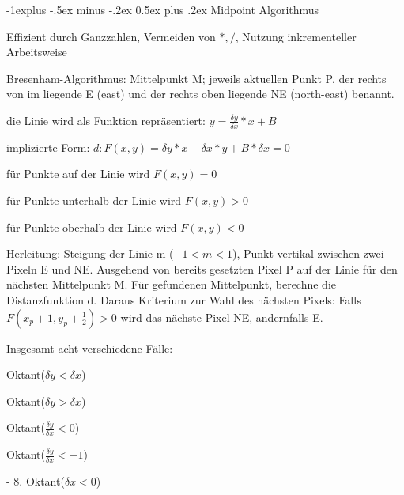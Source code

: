\documentclass[landscape]{article}
\makeatletter
\renewcommand{\subsection}{\@startsection{subsection}{2}{0mm}%
                                {-1explus -.5ex minus -.2ex}%
                                {0.5ex plus .2ex}%
                                {\normalfont\normalsize\bfseries}}
\makeatother
\begin{document}
\begin{multicols}{3}
  \subsection{ Midpoint Algorithmus}
  \begin{itemize*}
    \item Effizient durch Ganzzahlen, Vermeiden von $*,/$, Nutzung inkrementeller Arbeitsweise
    \item Bresenham-Algorithmus: Mittelpunkt M; jeweils aktuellen Punkt P, der rechts von im liegende E (east) und der rechts oben liegende NE (north-east) benannt.
    \item die Linie wird als Funktion repräsentiert: $y=\frac{\delta y}{\delta x}*x+B$
    \item implizierte Form: $d: F(x,y)=\delta y*x-\delta x*y+B*\delta x = 0$
    \item für Punkte auf der Linie wird $F(x,y)=0$
    \item für Punkte unterhalb der Linie wird $F(x,y)>0$
    \item für Punkte oberhalb der Linie wird $F(x,y)<0$
    \item Herleitung: Steigung der Linie m ($-1<m<1$), Punkt vertikal zwischen zwei Pixeln E und NE. Ausgehend von bereits gesetzten Pixel P auf der Linie für den nächsten Mittelpunkt M. Für gefundenen Mittelpunkt, berechne die Distanzfunktion d. Daraus Kriterium zur Wahl des nächsten Pixels: Falls $F(x_p + 1, y_p+\frac{1}{2})>0$ wird das nächste Pixel NE, andernfalls E.
    \item Insgesamt acht verschiedene Fälle:
    \begin{enumerate*}
      \item Oktant($\delta y < \delta x$)
      \item Oktant($\delta y > \delta x$)
      \item Oktant($\frac{\delta y}{\delta x}<  0$)
      \item Oktant($\frac{\delta y}{\delta x}< -1$)
      \item - 8. Oktant($\delta x < 0$)
    \end{enumerate*}
  \end{itemize*}
  

\end{multicols}
\end{document}
